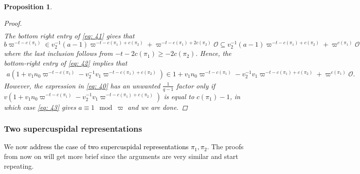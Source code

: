 \documentclass{amsart}
\theoremstyle{plain}
\newtheorem{prop}[thm]{Proposition}
\theoremstyle{plain}
\theoremstyle{remark}
\begin{document}
\begin{prop}
\begin{proof}
\begin{align}
            \end{align}
           The bottom right entry of \eqref{eq: 41} gives that
           $$b\varpi^{-t-c(\pi_1)}\in v_2^{-1}(a-1)\varpi^{-t-c(\pi_1)+c(\pi_2)}+\varpi^{-t-c(\pi_1)+2c(\pi_2)}\mathcal{O}\subseteq v_2^{-1}(a-1)\varpi^{-t-c(\pi_1)+c(\pi_2)}+\varpi^{c(\pi_1)}\mathcal{O}$$
            where the last inclusion follows from $-t-2c(\pi_1)\geq -2c(\pi_2)$. Hence, the bottom-right entry of \eqref{eq: 42} implies that
            \begin{align}\label{eq: 43}a(1+v_1n_0\varpi^{-t-c(\pi_1)}-v_2^{-1}v_1\varpi^{-t-c(\pi_1)+c(\pi_2)})\in 1+v_1n_0\varpi^{-t-c(\pi_1)}-v_2^{-1}v_1\varpi^{-t-c(\pi_1)+c(\pi_2)}+\varpi^{c(\pi_1)}\mathcal{O.}\end{align}
            However, the expression in \eqref{eq: 40} has an unwanted $\tfrac{1}{q-1}$ factor only if $v(1+v_1n_0\varpi^{-t-c(\pi_1)}-v_2^{-1}v_1\varpi^{-t-c(\pi_1)+c(\pi_2)})$ is equal to $c(\pi_1)-1$, in which case \eqref{eq: 43} gives $a\equiv 1\mod\varpi$ and we are done.
    \end{proof}
\end{prop}
\subsubsection{Two supercuspidal representations}
We now \textcolor{black}{address the case of two supercuspidal representations $\pi_1,\pi_2$}. The proofs from now on will get more brief since the arguments are very similar and start repeating.
\end{document}
